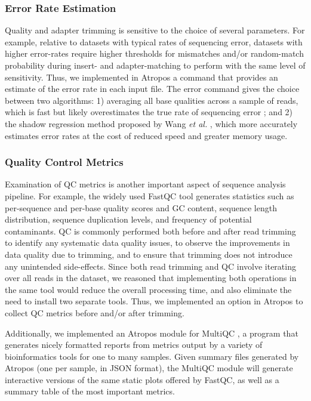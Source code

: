 \documentclass[fleqn,10pt,lineno]{wlpeerj} %
\begin{document}
\subsubsection{Error Rate Estimation}

Quality and adapter trimming is sensitive to the choice of several parameters. For example, relative to datasets with typical rates of sequencing error, datasets with higher error-rates require higher thresholds for mismatches and/or random-match probability during insert- and adapter-matching to perform with the same level of sensitivity. Thus, we implemented in Atropos a command that provides an estimate of the error rate in each input file. The error command gives the choice between two algorithms: 1) averaging all base qualities across a sample of reads, which is fast but likely overestimates the true rate of sequencing error \citep{dohm_substantial_2008,depristo_framework_2011}; and 2) the shadow regression method proposed by Wang \textit{et al.} \citep{wang_estimation_2012}, which more accurately estimates error rates at the cost of reduced speed and greater memory usage.

\subsubsection{Quality Control Metrics}

Examination of QC metrics is another important aspect of sequence analysis pipeline. For example, the widely used FastQC \citep{Andrews2010FastQC} tool generates statistics such as per-sequence and per-base quality scores and GC content, sequence length distribution, sequence duplication levels, and frequency of potential contaminants. QC is commonly performed both before and after read trimming to identify any systematic data quality issues, to observe the improvements in data quality due to trimming, and to ensure that trimming does not introduce any unintended side-effects. Since both read trimming and QC involve iterating over all reads in the dataset, we reasoned that implementing both operations in the same tool would reduce the overall processing time, and also eliminate the need to install two separate tools. Thus, we implemented an option in Atropos to collect QC metrics before and/or after trimming. 

Additionally, we implemented an Atropos module for MultiQC \citep{Ewels2016MultiQC}, a program that generates nicely formatted reports from metrics output by a variety of bioinformatics tools for one to many samples. Given summary files generated by Atropos (one per sample, in JSON format), the MultiQC module will generate interactive versions of the same static plots offered by FastQC, as well as a summary table of the most important metrics.
\end{document}

